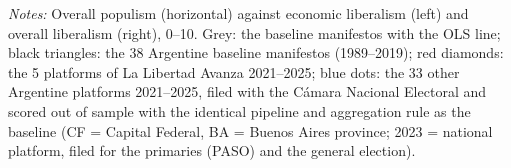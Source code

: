 \par\smallskip\begin{minipage}{\linewidth}\scriptsize\textit{Notes:} Overall populism (horizontal) against economic liberalism (left) and overall liberalism (right), 0--10. Grey: the baseline manifestos with the OLS line; black triangles: the 38 Argentine baseline manifestos (1989--2019); red diamonds: the 5 platforms of La Libertad Avanza 2021--2025; blue dots: the 33 other Argentine platforms 2021--2025, filed with the C\'amara Nacional Electoral and scored out of sample with the identical pipeline and aggregation rule as the baseline (CF = Capital Federal, BA = Buenos Aires province; 2023 = national platform, filed for the primaries (PASO) and the general election).\end{minipage}
